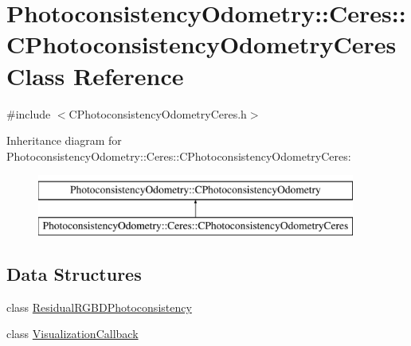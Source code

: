 \hypertarget{class_photoconsistency_odometry_1_1_ceres_1_1_c_photoconsistency_odometry_ceres}{
\section{PhotoconsistencyOdometry::Ceres::CPhotoconsistencyOdometryCeres Class Reference}
\label{class_photoconsistency_odometry_1_1_ceres_1_1_c_photoconsistency_odometry_ceres}
}


{\ttfamily \#include $<$CPhotoconsistencyOdometryCeres.h$>$}

Inheritance diagram for PhotoconsistencyOdometry::Ceres::CPhotoconsistencyOdometryCeres:\begin{figure}[H]
\begin{center}
\leavevmode
\includegraphics[height=2.000000cm]{class_photoconsistency_odometry_1_1_ceres_1_1_c_photoconsistency_odometry_ceres}
\end{center}
\end{figure}
\subsection*{Data Structures}
\begin{DoxyCompactItemize}
\item 
class \hyperlink{class_photoconsistency_odometry_1_1_ceres_1_1_c_photoconsistency_odometry_ceres_1_1_residual_r_g_b_d_photoconsistency}{ResidualRGBDPhotoconsistency}
\item 
class \hyperlink{class_photoconsistency_odometry_1_1_ceres_1_1_c_photoconsistency_odometry_ceres_1_1_visualization_callback}{VisualizationCallback}
\end{DoxyCompactItemize}
